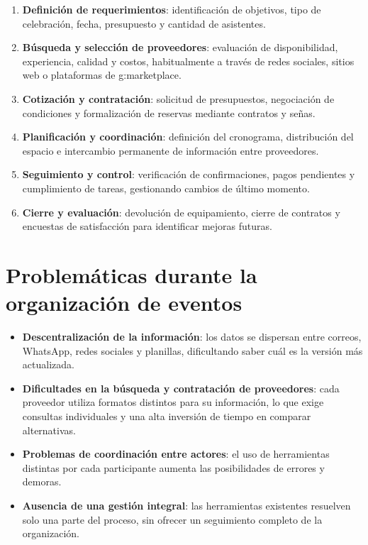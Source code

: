 \begin{enumerate}
    \item \textbf{Definición de requerimientos}: identificación de
          objetivos, tipo de celebración, fecha, presupuesto y cantidad
          de asistentes.
    \item \textbf{Búsqueda y selección de proveedores}: evaluación de
          disponibilidad, experiencia, calidad y costos, habitualmente a
          través de redes sociales, sitios web o plataformas de
          \gls{g:marketplace}.
    \item \textbf{Cotización y contratación}: solicitud de presupuestos,
          negociación de condiciones y formalización de reservas
          mediante contratos y señas.
    \item \textbf{Planificación y coordinación}: definición del
          cronograma, distribución del espacio e intercambio permanente
          de información entre proveedores.
    \item \textbf{Seguimiento y control}: verificación de confirmaciones,
          pagos pendientes y cumplimiento de tareas, gestionando cambios
          de último momento.
    \item \textbf{Cierre y evaluación}: devolución de equipamiento,
          cierre de contratos y encuestas de satisfacción para
          identificar mejoras futuras.
\end{enumerate}

\section{Problemáticas durante la organización de eventos}

\begin{itemize}
    \item \textbf{Descentralización de la información}: los datos se
          dispersan entre correos, WhatsApp, redes sociales y planillas,
          dificultando saber cuál es la versión más actualizada.
    \item \textbf{Dificultades en la búsqueda y contratación de
          proveedores}: cada proveedor utiliza formatos distintos para
          su información, lo que exige consultas individuales y una alta
          inversión de tiempo en comparar alternativas.
    \item \textbf{Problemas de coordinación entre actores}: el uso de
          herramientas distintas por cada participante aumenta las
          posibilidades de errores y demoras.
    \item \textbf{Ausencia de una gestión integral}: las herramientas
          existentes resuelven solo una parte del proceso, sin ofrecer un
          seguimiento completo de la organización.
\end{itemize}

